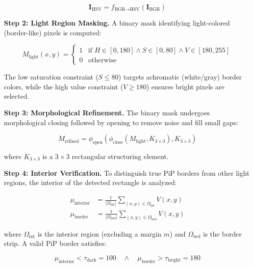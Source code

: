 \documentclass[journal]{IEEEtran}
\begin{document}
\begin{equation}
\mathbf{I}_{\text{HSV}} = f_{\text{BGR} \rightarrow \text{HSV}}(\mathbf{I}_{\text{BGR}})
\end{equation}

\textbf{Step 2: Light Region Masking.} A binary mask identifying light-colored (border-like) pixels is computed:

\begin{equation}
M_{\text{light}}(x, y) = \begin{cases} 
1 & \text{if } H \in [0, 180] \wedge S \in [0, 80] \wedge V \in [180, 255] \\ 
0 & \text{otherwise} 
\end{cases}
\end{equation}

The low saturation constraint ($S \leq 80$) targets achromatic (white/gray) border colors, while the high value constraint ($V \geq 180$) ensures bright pixels are selected.

\textbf{Step 3: Morphological Refinement.} The binary mask undergoes morphological closing followed by opening to remove noise and fill small gaps:

\begin{equation}
M_{\text{refined}} = \phi_{\text{open}}(\phi_{\text{close}}(M_{\text{light}}, K_{3 \times 3}), K_{3 \times 3})
\end{equation}

where $K_{3 \times 3}$ is a $3 \times 3$ rectangular structuring element.

\textbf{Step 4: Interior Verification.} To distinguish true PiP borders from other light regions, the interior of the detected rectangle is analyzed:

\begin{align}
\mu_{\text{interior}} &= \frac{1}{|\Omega_{\text{int}}|} \sum_{(x,y) \in \Omega_{\text{int}}} V(x, y) \\
\mu_{\text{border}} &= \frac{1}{|\Omega_{\text{brd}}|} \sum_{(x,y) \in \Omega_{\text{brd}}} V(x, y)
\end{align}

where $\Omega_{\text{int}}$ is the interior region (excluding a margin $m$) and $\Omega_{\text{brd}}$ is the border strip. A valid PiP border satisfies:

\begin{equation}
\mu_{\text{interior}} < \tau_{\text{dark}} = 100 \quad \wedge \quad \mu_{\text{border}} > \tau_{\text{bright}} = 180
\end{equation}
\end{document}
